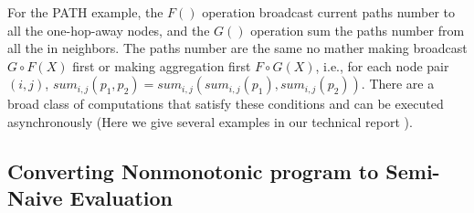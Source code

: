 \begin{comment}
<<<<<<< HEAD
For the SSSP example, the $F()$ operation expands the BFS searching scope to one-hop-away nodes, and the $G()$ operation picks the minimal distance resulted from the shortest path. The shortest distances are the same no matter making expansion first $G\circ F(X)$ or making aggregation first $F\circ G(X)$, i.e., for each node $j$, $min_j(d_j+w)=min_j(min_j(d_j)+w)$. There are a broad class of computations that satisfy these conditions and can be executed asynchronously (Here we give several examples in Appendix Sec. \ref{sec:app:example}).
=======
\end{comment}
For the PATH example, the $F()$ operation broadcast current paths number to all the one-hop-away nodes, and the $G()$ operation sum the paths number from all the in neighbors. The paths number are the same no mather making broadcast $G\circ F(X)$ first or making aggregation first $F\circ G(X)$, i.e., for each node pair $(i,j)$, $sum_{i,j}(p_1,p_2)= sum_{i,j}(sum_{i,j}(p_1),sum_{i,j}(p_2))$. There are a broad class of computations that satisfy these conditions and can be executed asynchronously (Here we give several examples in our technical report \cite{fullversion}).




\subsection{Converting Nonmonotonic program to Semi-Naive Evaluation}
\label{sec:async:convert}
\begin{comment}
<<<<<<< HEAD
Some non-monotonic computations cannot be written as accumulated recursive program and are not originally qualified for asynchronous aggregation. For example, the PageRank computation cannot be executed as an accumulated recursive program since the monotonic condition is not satisfied. After applying $F\circ G$ operations, the recursion result $X^{k}$ is replaced by $X^{k+1}$ but not contained in $X^{k+1}$. In other words, there is no incremental computing relationship between $X^k$ and $X^{k-1}$. Further, the aggregate operation $g(\{x_i\})=\sum_i{x_i}+0.15$ does not have the accumulative property due to the additional constant $0.15$.

Fortunately, Some of these computations can be converted to accumulative recursive aggregation.The key of the conversion is to incrementally computing the original problem $X^k=(G\circ F)^n(X^0)$ and iteratively computing the incremental value $\Delta X^k$ of each recursion using normal recursive aggregation. i.e.,
=======
\end{comment}

